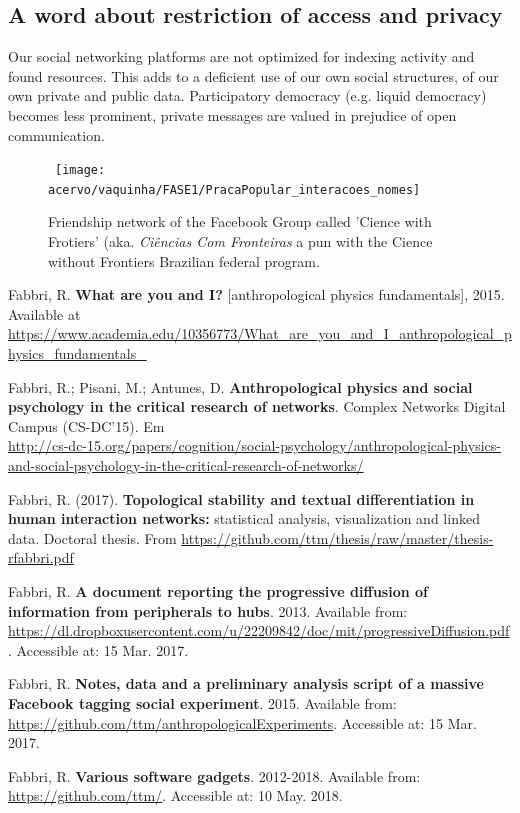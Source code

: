 \documentclass[a4paper]{article}
\begin{document}
\subsection{A word about restriction of access and privacy}
Our social networking platforms are not optimized for indexing activity
and found resources.
This adds to a deficient use of our own social structures,
of our own private and public data.
Participatory democracy (e.g. liquid democracy) becomes less prominent,
private messages are valued in prejudice of open communication.

\begin{figure}\label{nh}
  \centering
    \hbox{\hspace{1.5em} \texttt{[image: acervo/vaquinha/FASE1/PracaPopular\_interacoes\_nomes]}}
  \caption{Friendship network of the Facebook Group called 'Cience with Frotiers' (aka. \emph{Ciências Com Fronteiras} a pun with the Cience without Frontiers Brazilian federal program.}
\end{figure}

\begin{thebibliography}{9}
	Fabbri, R. \textbf{What are you and I?} [anthropological physics fundamentals], 2015. Available at \url{https://www.academia.edu/10356773/What\_are\_you\_and\_I\_anthropological\_physics\_fundamentals\_}

	Fabbri, R.; Pisani, M.; Antunes, D. \textbf{Anthropological physics and social psychology in the critical research of networks}. Complex Networks Digital Campus (CS-DC'15).
	Em \\\url{http://cs-dc-15.org/papers/cognition/social-psychology/anthropological-physics-and-social-psychology-in-the-critical-research-of-networks/}

Fabbri, R. (2017). \textbf{Topological stability and textual differentiation in human interaction networks:}
		statistical analysis, visualization and linked data. Doctoral thesis.
		From \url{https://github.com/ttm/thesis/raw/master/thesis-rfabbri.pdf}

	Fabbri, R. \textbf{A document reporting the progressive diffusion of information from peripherals to hubs}. 2013. Available from: \url{https://dl.dropboxusercontent.com/u/22209842/doc/mit/progressiveDiffusion.pdf}. Accessible at: 15 Mar. 2017.

	Fabbri, R. \textbf{Notes, data and a preliminary analysis script of a massive Facebook tagging social experiment}. 2015. Available from: \url{https://github.com/ttm/anthropologicalExperiments}. Accessible at: 15 Mar. 2017.

	Fabbri, R. \textbf{Various software gadgets}. 2012-2018. Available from: \url{https://github.com/ttm/}. Accessible at: 10 May. 2018.

\end{thebibliography}
\end{document}
